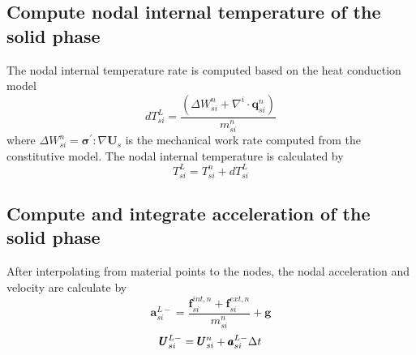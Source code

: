 \documentclass[preprint,12pt]{elsarticle}
\begin{document}
\subsection{\textsf{Compute nodal internal temperature of the solid phase}}
%
%
The nodal internal temperature rate is computed based on the heat conduction model
%
%
\begin{equation}
     dT_{si}^L = \frac{(\Delta W_{si}^n + \nabla^i \cdot \pmb{q}_{si}^n)}{m_{si}^n}
\end{equation}
%
%
where $\Delta W_{si}^n = \pmb{\sigma}^\prime : \nabla \pmb{U}_s$ is the mechanical work rate computed from the constitutive model. The nodal internal temperature is calculated by
\begin{equation}
     T_{si}^L = T_{si}^n + dT_{si}^L
\end{equation}
%
%
\subsection{\textsf{Compute and integrate acceleration of the solid phase}}
After interpolating from material points to the nodes, the nodal acceleration and velocity are calculate by
%
%
\begin{equation}
     \pmb{a}_{si}^{L-} = \frac{\pmb{f}_{si}^{int,n} + \pmb{f}_{si}^{ext,n}}{m_{si}^n} + \pmb{g}
\end{equation}
\begin{equation}
     \pmb{U}_{si}^{L-} = \pmb{U}_{si}^n + \pmb{a}_{si}^{L-} \Delta{t}
\end{equation}
%
%
\end{document}
